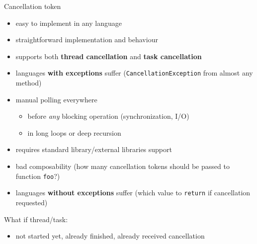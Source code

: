 \begin{frame}[fragile]{Cancellation token}

\begin{itemize}
    \item easy to implement in any language
    \item straightforward implementation and behaviour
    \item supports both \textbf{thread cancellation} and \textbf{task cancellation}
    \item languages \textbf{with exceptions} suffer (\texttt{CancellationException} from almost any method)
\end{itemize}

\pause

\begin{itemize}
    \item manual polling everywhere
    \begin{itemize}
        \item before \textit{any} blocking operation (synchronization, I/O)
        \item in long loops or deep recursion
    \end{itemize}        
    \item requires standard library/external libraries support 
    \item bad composability (how many cancellation tokens should be passed to function \texttt{foo}?)
    \item languages \textbf{without exceptions} suffer (which value to \texttt{return} if cancellation requested)
\end{itemize}

\pause

What if thread/task:
\begin{itemize}
    \item not started yet, already finished, already received cancellation
\end{itemize}

\pause

\end{frame}


